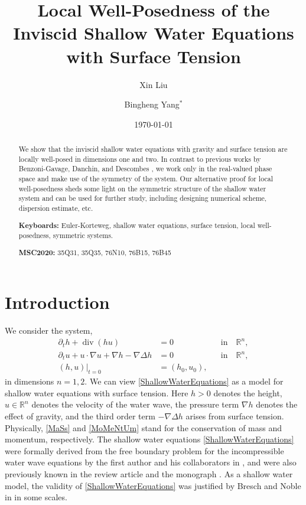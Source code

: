 \documentclass[reqno,11pt]{amsart}
\title[Inviscid shallow water equations]{Local Well-Posedness of the Inviscid Shallow Water Equations with Surface Tension}
\date{\today}
\author[]{Xin Liu \orcidlink{0000-0001-7021-8644}}
\author[]{Bingheng Yang$^*$ \orcidlink{0009-0005-0380-1596}}
\DeclareMathOperator{\Div}{div}
\theoremstyle{plain}
\theoremstyle{definition}
\numberwithin{equation}{section}
\begin{document}
\begin{abstract}
We show that the inviscid shallow water equations with gravity and surface tension 
are locally well-posed in dimensions one and two. In contrast to previous works by Benzoni-Gavage, Danchin, and Descombes \cite{BenzoniGavageDanchinDescombes1D,BenzoniGavageDanchinDescombes3D}, we work only in the real-valued phase space and make use of the symmetry of the system. Our alternative proof for local well-posedness sheds some light on the symmetric structure of the shallow water system and can be used for further study, including designing numerical scheme, dispersion estimate, etc.

\smallskip 

{\noindent\bf Keyboards:} Euler-Korteweg, shallow water equations, surface tension, local well-posedness, symmetric systems.

{\noindent\bf MSC2020:} 35Q31, 35Q35, 76N10, 76B15, 76B45

\end{abstract}


\maketitle


{
  \hypersetup{linkcolor=blue}
  \tableofcontents
}

\section{Introduction}
We consider the system, %
\begin{subequations}
\label{ShallowWaterEquations}
\begin{align}
\label{MaSs}
\partial_t h+\Div(hu)& = 0 \quad && \text{in} \quad \mathbb{R}^n, \\
\label{MoMeNtUm}
\partial_t u+u\cdot\nabla u+\nabla h-\nabla \Delta h & =0 \quad &&\text{in} \quad \mathbb{R}^n, \\
(h,u)\vert_{t=0} & =(h_0,u_0), 
\end{align}
\end{subequations}
in dimensions $ n = 1,2 $. We can view \eqref{ShallowWaterEquations} as a model for shallow water equations with surface tension. Here $h > 0$ denotes the height, $u \in \mathbb R^n$ denotes the velocity of the water wave, the pressure term  $\nabla h$ denotes the effect of gravity, and the third order term $-\nabla\Delta h$ arises from surface tension. Physically, \eqref{MaSs} and \eqref{MoMeNtUm} stand for the conservation of mass and momentum, respectively. The shallow water equations \eqref{ShallowWaterEquations} were formally derived from the free boundary problem for the incompressible water wave equations by the first author and his collaborators in \cite{LiLiuPeschka}, and were also previously known in the review article \cite{BreschDesjardinsMetivier} and the monograph \cite{Bresch}. As a shallow water model, the validity of \eqref{ShallowWaterEquations} was justified by Bresch and Noble in \cite{BreschNoble} in some scales. 
\end{document}
